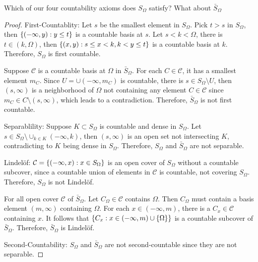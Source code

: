 \documentclass[12pt,a4paper]{article}
\begin{document}
    \begin{ex}
        Which of our four countability axioms does $S_\Omega$ satisfy? What about $\bar{S}_\Omega$
    \end{ex}
    \begin{proof}
        First-Countablity: Let $s$ be the smallest element in $S_\Omega$. Pick $t>s$ in $S_\Omega$, then $\left\{(-\infty,y):y\leq t\right\}$ is a countable basis at $s$. Let $s<k<\Omega$, there is $t\in(k,\Omega)$, then $\left\{(x,y):s\leq x<k,k<y\leq t\right\}$ is a countable basis at $k$. Therefore, $S_\Omega$ is first countable. 

        Suppose $\mathcal{C}$ is a countable basis at $\Omega$ in $\bar{S}_{\Omega}$. For each $C\in\mathcal{C}$, it has a smallest element $m_C$. Since $U=\cup(-\infty,m_C)$ is countable, there is $s\in S_\Omega\setminus U$, then $(s,\infty)$ is a neighborhood of $\Omega$ not containing any element $C\in\mathcal{C}$ since $m_C\in C\setminus(s,\infty)$, which leads to a contradiction. Therefore, $\bar{S}_{\Omega}$ is not first countable.
        \vspace{1em}

        Separablility: Suppose $K\subset S_\Omega$ is countable and dense in $S_\Omega$. Let $s\in S_\Omega\setminus\cup_{k\in K}(-\infty,k)$, then $(s,\infty)$ is an open set not intersecting $K$, contradicting to $K$ being dense in $S_\Omega$. Therefore, $S_\Omega$ and $\bar{S}_\Omega$ are not separable.  
        \vspace{1em}

        Lindel\"of: $\mathcal{C}=\left\{(-\infty,x):x\in S_\Omega\right\}$ is an open cover of $S_\Omega$ without a countable subcover, since a countable union of elements in $\mathcal{C}$ is countable, not covering $S_\Omega$. Therefore, $S_\Omega$ is not Lindel\"of. 

        For all open cover $\mathcal{C}$ of $\bar{S}_\Omega$. Let $C_\Omega\in\mathcal{C}$ contains $\Omega$. Then $C_\Omega$ must contain a basis element $(m,\infty)$ containing $\Omega$. For each $x\in(-\infty,m)$, there is a $C_x\in\mathcal{C}$ containing $x$. It follows that $\left\{C_x:x\in(-\infty,m)\cup\left\{\Omega\right\}\right\}$ is a countable subcover of $\bar{S}_\Omega$. Therefore, $\bar{S}_\Omega$ is Lindel\"of.
        \vspace{1em}
        
        Second-Countability: $S_\Omega$ and $\bar{S}_{\Omega}$ are not second-countable since they are not separable.
    \end{proof}
    \hfill
\end{document}
